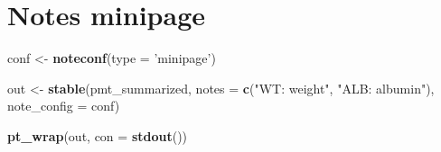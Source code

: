 \documentclass[
]{article}
\newenvironment{Shaded}{\begin{snugshade}}{\end{snugshade}}
\newcommand{\ControlFlowTok}[1]{\textcolor[rgb]{0.13,0.29,0.53}{\textbf{#1}}}
\newcommand{\DataTypeTok}[1]{\textcolor[rgb]{0.13,0.29,0.53}{#1}}
\newcommand{\KeywordTok}[1]{\textcolor[rgb]{0.13,0.29,0.53}{\textbf{#1}}}
\newcommand{\NormalTok}[1]{#1}
\newcommand{\OperatorTok}[1]{\textcolor[rgb]{0.81,0.36,0.00}{\textbf{#1}}}
\newcommand{\StringTok}[1]{\textcolor[rgb]{0.31,0.60,0.02}{#1}}
\begin{document}
\begin{Shaded}
\end{Shaded}

\clearpage

\hypertarget{notes-minipage}{%
\section{Notes minipage}\label{notes-minipage}}

\begin{Shaded}
\begin{Highlighting}[]
\NormalTok{conf <-}\StringTok{ }\KeywordTok{noteconf}\NormalTok{(}\DataTypeTok{type =} \StringTok{'minipage'}\NormalTok{)}

\NormalTok{out <-}\StringTok{ }\KeywordTok{stable}\NormalTok{(pmt_summarized, }\DataTypeTok{notes =} \KeywordTok{c}\NormalTok{(}\StringTok{"WT: weight"}\NormalTok{, }\StringTok{"ALB: albumin"}\NormalTok{), }\DataTypeTok{note_config =}\NormalTok{ conf)}

\KeywordTok{pt_wrap}\NormalTok{(out, }\DataTypeTok{con =} \KeywordTok{stdout}\NormalTok{()) }
\end{Highlighting}
\end{Shaded}
\end{document}
